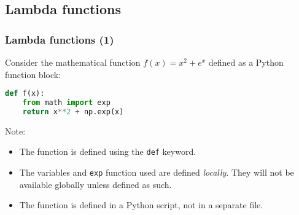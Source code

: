 




\subsection{Lambda functions}
\begin{frame}[fragile]
  \frametitle{Lambda functions (1)}
  Consider the mathematical function \(f(x) = x^2+e^x\) defined as a Python function block:
  \begin{lstlisting}[language=Python]
def f(x):
    from math import exp
    return x**2 + np.exp(x)
  \end{lstlisting}
  Note:
  \begin{itemize}
    \item The function is defined using the \lstinline|def| keyword.
    \item The variables and \lstinline|exp| function used are defined \emph{locally}. They will not be available globally unless defined as such.
    \item The function is defined in a Python script, not in a separate file.
  \end{itemize}
\end{frame}


